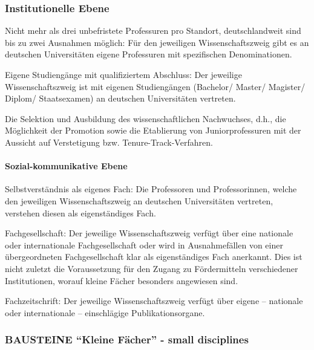 \hypertarget{institutionelle-ebene}{%
\subsubsection{Institutionelle Ebene}\label{institutionelle-ebene}}

Nicht mehr als drei unbefristete Professuren pro Standort,
deutschlandweit sind bis zu zwei Ausnahmen möglich: Für den jeweiligen
Wissenschaftszweig gibt es an deutschen Universitäten eigene Professuren
mit spezifischen Denominationen.

Eigene Studiengänge mit qualifiziertem Abschluss: Der jeweilige
Wissenschaftszweig ist mit eigenen Studiengängen (Bachelor/ Master/
Magister/ Diplom/ Staatsexamen) an deutschen Universitäten vertreten.

Die Selektion und Ausbildung des wissenschaftlichen Nachwuchses, d.h.,
die Möglichkeit der Promotion sowie die Etablierung von
Juniorprofessuren mit der Aussicht auf Verstetigung bzw.
Tenure-Track-Verfahren.

\hypertarget{sozial-kommunikative-ebene}{%
\paragraph{Sozial-kommunikative
Ebene}\label{sozial-kommunikative-ebene}}

Selbstverständnis als eigenes Fach: Die Professoren und Professorinnen,
welche den jeweiligen Wissenschaftszweig an deutschen Universitäten
vertreten, verstehen diesen als eigenständiges Fach.

Fachgesellschaft: Der jeweilige Wissenschaftszweig verfügt über eine
nationale oder internationale Fachgesellschaft oder wird in
Ausnahmefällen von einer übergeordneten Fachgesellschaft klar als
eigenständiges Fach anerkannt. Dies ist nicht zuletzt die Voraussetzung
für den Zugang zu Fördermitteln verschiedener Institutionen, worauf
kleine Fächer besonders angewiesen sind.

Fachzeitschrift: Der jeweilige Wissenschaftszweig verfügt über eigene --
nationale oder internationale -- einschlägige Publikationsorgane.

\hypertarget{bausteine-kleine-fuxe4cher---small-disciplines}{%
\subsubsection{BAUSTEINE ``Kleine Fächer'' - small
disciplines}\label{bausteine-kleine-fuxe4cher---small-disciplines}}

